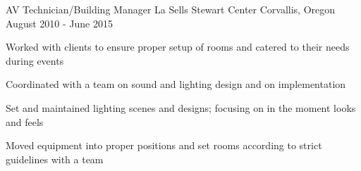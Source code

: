 \begin{cventries}
  \cventry
    {AV Technician/Building Manager} %
    {La Sells Stewart Center} %
    {Corvallis, Oregon} %
    {August 2010 - June 2015} %
    {
      \begin{cvitems} %
        \item {Worked with clients to ensure proper setup of rooms and catered to their needs during events}
        \item {Coordinated with a team on sound and lighting design and on implementation}
        \item {Set and maintained lighting scenes and designs; focusing on in the moment looks and feels}
        \item {Moved equipment into proper positions and set rooms according to strict guidelines with a team}
      \end{cvitems}
    }

\end{cventries}
